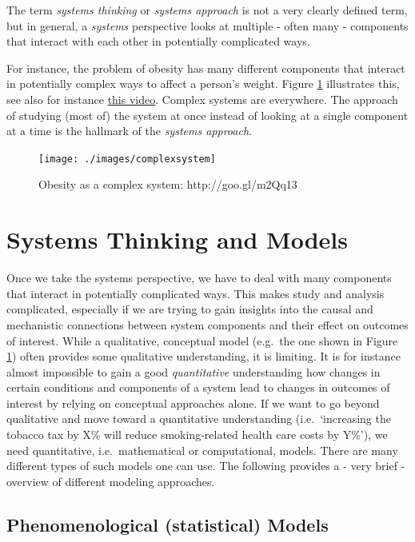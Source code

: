 \documentclass[
]{book}
\begin{document}
The term \emph{systems thinking} or \emph{systems approach} is not a very clearly defined term, but in general, a \emph{systems} perspective looks at multiple - often many - components that interact with each other in potentially complicated ways.

For instance, the problem of obesity has many different components that interact in potentially complex ways to affect a person's weight. Figure \ref{fig:obesitysystem} illustrates this, see also for instance \href{https://youtu.be/2vojPksdbtI}{this video}. Complex systems are everywhere. The approach of studying (most of) the system at once instead of looking at a single component at a time is the hallmark of the \emph{systems approach}.

\begin{figure}
\texttt{[image: ./images/complexsystem]} \caption{Obesity as a complex system: http://goo.gl/m2Qq13}\label{fig:obesitysystem}
\end{figure}

\hypertarget{systems-thinking-and-models}{%
\section{Systems Thinking and Models}\label{systems-thinking-and-models}}

Once we take the systems perspective, we have to deal with many components that interact in potentially complicated ways. This makes study and analysis complicated, especially if we are trying to gain insights into the causal and mechanistic connections between system components and their effect on outcomes of interest. While a qualitative, conceptual model (e.g.~the one shown in Figure \ref{fig:obesitysystem}) often provides some qualitative understanding, it is limiting. It is for instance almost impossible to gain a good \emph{quantitative} understanding how changes in certain conditions and components of a system lead to changes in outcomes of interest by relying on conceptual approaches alone. If we want to go beyond qualitative and move toward a quantitative understanding (i.e.~`increasing the tobacco tax by X\% will reduce smoking-related health care costs by Y\%'), we need quantitative, i.e.~mathematical or computational, models. There are many different types of such models one can use. The following provides a - very brief - overview of different modeling approaches.

\hypertarget{phenomenological-statistical-models}{%
\subsection{Phenomenological (statistical) Models}\label{phenomenological-statistical-models}}
\end{document}
